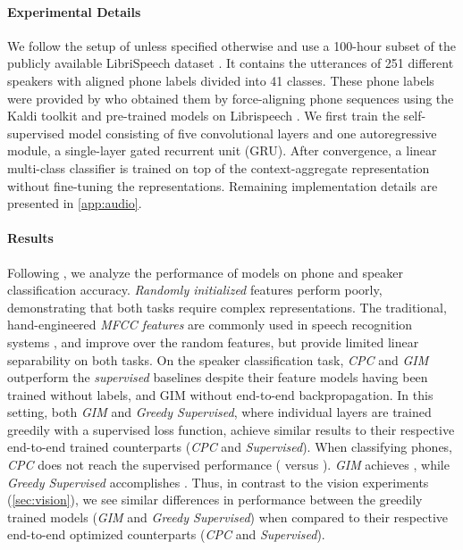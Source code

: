 \documentclass{article}
\begin{document}
\paragraph{Experimental Details}
We follow the setup of \citet{oord2018representation} unless specified otherwise and use a 100-hour subset of the publicly available LibriSpeech dataset \citep{panayotov2015librispeech}. It contains the utterances of 251 different speakers with aligned phone labels divided into 41 classes. These phone labels were provided by \citet{oord2018representation} who obtained them by force-aligning phone sequences using the Kaldi toolkit \citep{povey2011kaldi} and pre-trained models on Librispeech \citep{kaldi_model}.
We first train the self-supervised model consisting of five convolutional layers and one autoregressive module, a single-layer gated recurrent unit (GRU). After convergence, a linear multi-class classifier is trained on top of the context-aggregate representation  without fine-tuning the representations. Remaining implementation details are presented in \cref{app:audio}. 

\paragraph{Results} 
Following , we analyze the performance of models on phone and speaker classification accuracy. \textit{Randomly initialized} features perform poorly, demonstrating that both tasks require complex representations. The traditional, hand-engineered \textit{MFCC features} are commonly used in speech recognition systems \citep{ganchev2005comparative}, and improve over the random features, but provide limited linear separability on both tasks. On the speaker classification task, \textit{CPC} and \textit{GIM} outperform the \textit{supervised} baselines despite their feature models having been trained without labels, and GIM without end-to-end backpropagation. In this setting, both \textit{GIM} and \textit{Greedy Supervised}, where individual layers are trained greedily with a supervised loss function, achieve similar results to their respective end-to-end trained counterparts (\textit{CPC} and \textit{Supervised}). When classifying phones, \textit{CPC} does not reach the supervised performance ( versus ). \textit{GIM} achieves , while \textit{Greedy Supervised} accomplishes . Thus, in contrast to the vision experiments (\cref{sec:vision}), we see similar differences in performance between the greedily trained models (\textit{GIM} and \textit{Greedy Supervised}) when compared to their respective end-to-end optimized counterparts (\textit{CPC} and \textit{Supervised}). 
\end{document}
